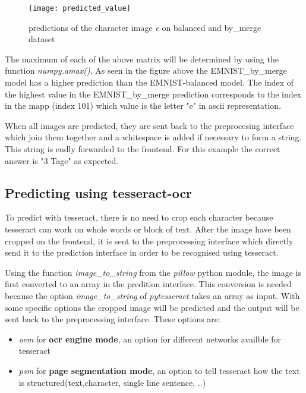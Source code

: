 \begin{figure}[htb]
	\centering
	\texttt{[image: predicted\_value]}
	\caption[Prediction output]{predictions of the character image \emph{e} on balanced and by\_merge dataset} \label{Abb:predicted_value}
\end{figure}

\noindent
The maximum of each of the above matrix will be determined by using the function \emph{numpy.amax()}. 
As seen in the figure above the 
EMNIST\_by\_merge model has a higher prediction than the EMNIST-balanced model.
The index of the highest value in the EMNIST\_by\_merge prediction corresponds to the index in the mapp
(index 101) which value is the letter "e" in ascii representation. 

\noindent 
When all images are predicted, they are sent back to the preprocesing interface which 
join them together and a whitespace is added if necessary to form a string. This string is endly
forwarded to the frontend. For this example the correct answer is "3 Tage" as expected.

\subsection{Predicting using tesseract-ocr}
To predict with tesseract, there is no need to crop each character because tesseract can work on whole words or block of text.
After the image have been cropped on the frontend, it is sent to the preprocessing interface which directly send it to the 
prediction interface in order to be recognised using tesseract.

\noindent
Using the function \emph{image\_to\_string} from the \emph{pillow} python module, the image is first converted to an array 
in the predition interface. 
This conversion is needed because the option \emph{image\_to\_string} of \emph{pytesseract} takes an array as input. 
With some specific options the cropped image will be predicted and the output will be sent back to the preprocessing interface. 
These options are: 
\begin{itemize}
    \item \emph{oem} for \textbf{ocr engine mode}, an option for different networks availble for tesseract
    \item \emph{psm} for \textbf{page segmentation mode}, an option to tell tesseract how the text is structured(text,character, single line sentence, ..)
\end{itemize}

